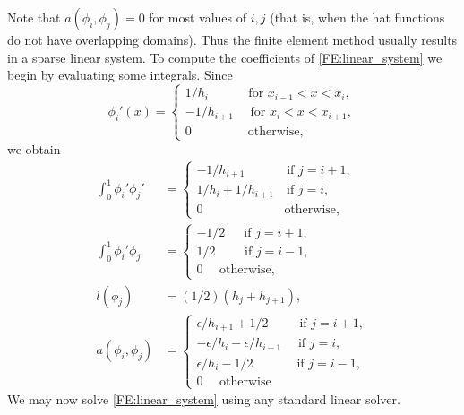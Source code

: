 Note that $a(\phi_i,\phi_j) = 0$ for most values of $i, j$ (that is, when the hat functions do not have overlapping domains).  Thus the finite element method usually results in a sparse linear system. 
To compute the coefficients of \eqref{FE:linear_system} we begin by evaluating some integrals. Since
\[
\phi_i'(x) = \begin{cases}
1/h_i \quad \quad \quad \, \text{for } x_{i-1} < x < x_i,\\
 -1/h_{i+1} \quad \text{ for } x_{i} < x < x_{i+1},\\
0 \quad \quad \quad \quad \, \text{ otherwise},
\end{cases}
\]
we obtain  
\begin{align*}
\int_0^1  \phi_i'\phi_j' &= \begin{cases}
- 1/h_{i+1} \quad \quad \quad \text{ if } j=i+1,\\
1/h_i + 1/h_{i+1} \quad \text{if } j=i,\\
0 \quad \quad \quad \quad \quad \quad \, \text{ otherwise},
\end{cases} \\
\int_0^1  \phi_i'\phi_j &= \begin{cases}
- 1/2 \quad \,\text{ if } j=i+1,\\
1/2 \quad \quad \text{ if } j=i-1,\\
0 \quad \text{ otherwise},
\end{cases} \\
l(\phi_j) &= (1/2)(h_j + h_{j+1}) , \\
a(\phi_i,\phi_j) &= \begin{cases}
\epsilon/h_{i+1} + 1/2 \quad \quad \, \text{ if } j=i+1,\\
-\epsilon/h_i -\epsilon/h_{i+1} \quad  \text{ if } j=i,\\
\epsilon/h_i - 1/2 \quad \quad \quad \, \text{ if } j=i-1,\\
0 \quad \text{ otherwise}
\end{cases}
\end{align*}
We may now solve \eqref{FE:linear_system} using any standard linear solver. 
% 

